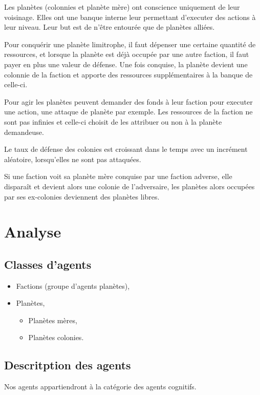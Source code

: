 \documentclass{article}
\begin{document}
	Les planètes (colonnies et planète mère) ont conscience uniquement de leur voisinage. Elles ont une banque interne leur permettant d'executer des actions à leur niveau. Leur but est de n'être entourée que de planètes alliées.
	
	Pour conquérir une planète limitrophe, il faut dépenser une certaine quantité de ressources, et lorsque la planète est déjà occupée par une autre faction, il faut payer en plus une valeur de défense. Une fois conquise, la planète devient une colonnie de la faction et apporte des ressources supplémentaires à la banque de celle-ci.
	
	Pour agir les planètes peuvent demander des fonds à leur faction pour executer une action, une attaque de planète par exemple. Les ressources de la faction ne sont pas infinies et celle-ci choisit de les attribuer ou non à la planète demandeuse.   

    Le taux de défense des colonies est croissant dans le temps avec un incrément aléatoire, lorsqu'elles ne sont pas attaquées. 
	
	Si une faction voit sa planète mère conquise par une faction adverse, elle disparaît et devient alors une colonie de l'adversaire, les planètes alors occupées par ses ex-colonies deviennent des planètes libres. 

  \section{Analyse}
    \subsection{Classes d'agents}
      \begin{itemize}
        \item Factions (groupe d'agents planètes),
        \item Planètes,
        \begin{itemize}
          \item Planètes mères,
          \item Planètes colonies.
        \end{itemize}
      \end{itemize}

    \subsection{Descritption des agents}
      Nos agents appartiendront à la catégorie des agents cognitifs. 
\end{document}
